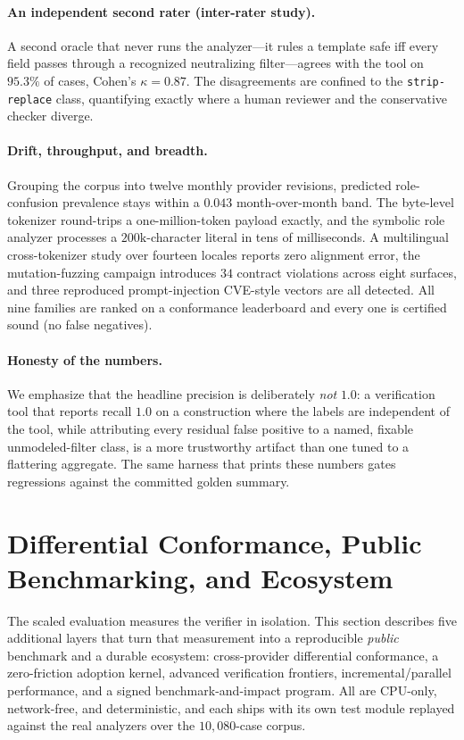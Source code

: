 \documentclass[10pt]{article}
\begin{document}
\paragraph{An independent second rater (inter-rater study).}
A second oracle that never runs the analyzer---it rules a template safe iff every
field passes through a recognized neutralizing filter---agrees with the tool on
$95.3\%$ of cases, Cohen's $\kappa = 0.87$. The disagreements are confined to the
\texttt{strip-replace} class, quantifying exactly where a human reviewer and the
conservative checker diverge.

\paragraph{Drift, throughput, and breadth.}
Grouping the corpus into twelve monthly provider revisions, predicted
role-confusion prevalence stays within a $0.043$ month-over-month band. The
byte-level tokenizer round-trips a one-million-token payload exactly, and the
symbolic role analyzer processes a $200\mathrm{k}$-character literal in tens of
milliseconds. A multilingual cross-tokenizer study over fourteen locales reports
zero alignment error, the mutation-fuzzing campaign introduces $34$ contract
violations across eight surfaces, and three reproduced prompt-injection CVE-style
vectors are all detected. All nine families are ranked on a conformance
leaderboard and every one is certified sound (no false negatives).

\paragraph{Honesty of the numbers.}
We emphasize that the headline precision is deliberately \emph{not} $1.0$: a
verification tool that reports recall $1.0$ on a construction where the labels
are independent of the tool, while attributing every residual false positive to a
named, fixable unmodeled-filter class, is a more trustworthy artifact than one
tuned to a flattering aggregate. The same harness that prints these numbers gates
regressions against the committed golden summary.


\section{Differential Conformance, Public Benchmarking, and Ecosystem}
\label{sec:bench-ecosystem}

The scaled evaluation measures the verifier in isolation. This section describes
five additional layers that turn that measurement into a reproducible
\emph{public} benchmark and a durable ecosystem: cross-provider differential
conformance, a zero-friction adoption kernel, advanced verification frontiers,
incremental/parallel performance, and a signed benchmark-and-impact program.
All are CPU-only, network-free, and deterministic, and each ships with its own
test module replayed against the real analyzers over the $10{,}080$-case corpus.
\end{document}
